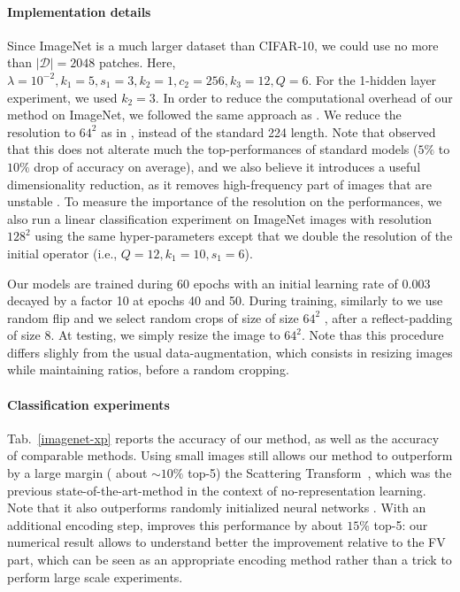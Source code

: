 \documentclass{article}
\begin{document}
\paragraph{Implementation details}  Since ImageNet is a much larger dataset than CIFAR-10, we could  use no more than $|\mathcal{D}|=2048$ patches.
Here, $\lambda=10^{-2}, k_1=5,s_1=3, k_2=1, c_2=256, k_3=12, Q=6$. For the 1-hidden layer experiment, we used $k_2=3$.
In order to reduce the computational overhead of our method on ImageNet, we followed the same approach as \cite{DBLP:journals/corr/ChrabaszczLH17}. We reduce the resolution to $64^2$ as in \cite{DBLP:journals/corr/ChrabaszczLH17}, instead of the standard 224 length.  Note that \cite{DBLP:journals/corr/ChrabaszczLH17}  observed that this does not alterate much the top-performances of standard models ($5 \%$ to $10\%$ drop of accuracy on average), and we also believe it introduces a useful dimensionality reduction, as it removes high-frequency part of images that are  unstable
\citet{mallat1999wavelet}.
To measure the importance of the resolution on the performances, we also run a linear classification experiment on  ImageNet images with resolution $128^2$ using the same hyper-parameters except that we double the resolution of the initial operator (i.e., $Q=12, k_1=10,s_1=6$).

Our models are trained during 60 epochs with an initial learning rate of 0.003 decayed by a factor 10 at epochs 40 and 50.
During training, similarly to \cite{DBLP:journals/corr/ChrabaszczLH17} we use random flip and we select random crops of size of size $64^2$ , after a reflect-padding of size 8. At testing, we simply resize the image to $64^2$.
Note thas this procedure differs slighly from the usual data-augmentation, which consists in resizing images while maintaining ratios, before a random cropping.








\paragraph{Classification experiments}
Tab.~\ref{imagenet-xp} reports the accuracy of our method, as well as the accuracy of comparable methods. Using small images still allows our method to outperform by a large margin ( about $\sim 10\%$ top-5) the  Scattering Transform~\citet{mallat2012group}, which was the previous state-of-the-art-method in the context of no-representation learning. Note that it also outperforms randomly initialized neural networks \citet{arandjelovic2017look}. With an additional  encoding step, \cite{sanchez2013image} improves this performance by about $15\%$ top-5: our numerical result allows to understand better the improvement relative to the FV part, which can be seen as an appropriate encoding method rather than a trick to perform large scale experiments.
\end{document}
